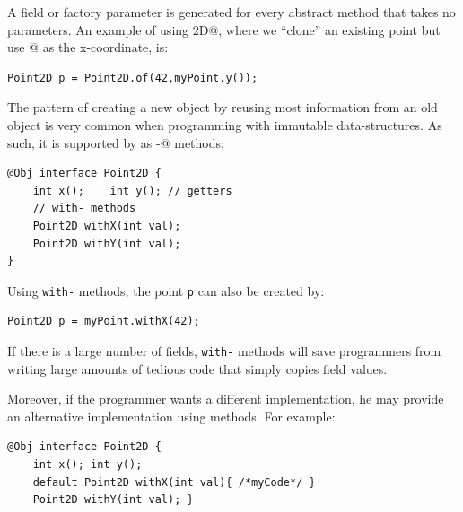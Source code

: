 \noindent A field or factory parameter is generated for every
abstract method that takes no parameters.
 An example of using \Q@Point2D@, where we ``clone'' an existing point
 but use
 @ as the x-coordinate, is:
\begin{lstlisting}
Point2D p = Point2D.of(42,myPoint.y());
\end{lstlisting}

The pattern of creating a new object by reusing most information from an old
object is very common when programming with immutable
data-structures. As such, it is
supported by \mixin as \Q@with-@ methods:
\begin{lstlisting}
@Obj interface Point2D {
    int x();    int y(); // getters
    // with- methods
    Point2D withX(int val);
    Point2D withY(int val);
}
\end{lstlisting}

\noindent Using \texttt{with-} methods, the point \texttt{p} can also be created
by:

\begin{lstlisting}
Point2D p = myPoint.withX(42);
\end{lstlisting}

\noindent If there is a large number of fields, \texttt{with-} methods
will save programmers from writing large amounts of tedious code that
simply copies field values.

Moreover, if the programmer wants a different implementation, he may
provide an alternative implementation using \Q@default@ methods. For example:
\begin{lstlisting}
@Obj interface Point2D {
    int x(); int y();
    default Point2D withX(int val){ /*myCode*/ }
    Point2D withY(int val); }
\end{lstlisting}

